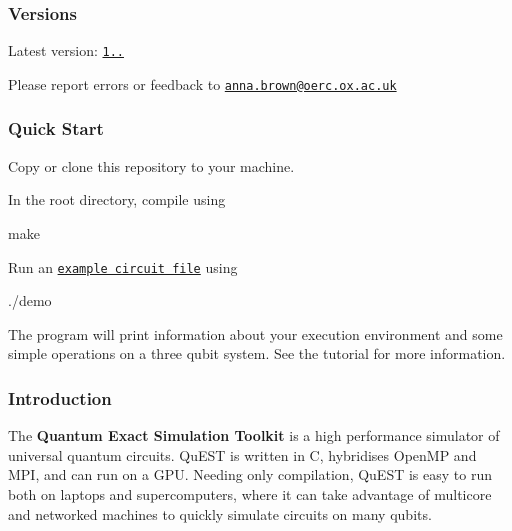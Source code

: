\subsubsection*{Versions}

Latest version\+: \href{https://github.com/aniabrown/QuEST/releases/tag/v1.0.0}{\tt 1..}

Please report errors or feedback to \href{mailto:anna.brown@oerc.ox.ac.uk}{\tt anna.\+brown@oerc.\+ox.\+ac.\+uk}

\subsubsection*{Quick Start}

Copy or clone this repository to your machine.

In the root directory, compile using


\begin{DoxyCode}
make
\end{DoxyCode}


Run an \href{tutorialExample.c}{\tt example circuit file} using


\begin{DoxyCode}
./demo
\end{DoxyCode}


The program will print information about your execution environment and some simple operations on a three qubit system. See the tutorial for more information.

\subsubsection*{Introduction}

The {\bfseries Quantum Exact Simulation Toolkit} is a high performance simulator of universal quantum circuits. Qu\+E\+ST is written in C, hybridises Open\+MP and M\+PI, and can run on a G\+PU. Needing only compilation, Qu\+E\+ST is easy to run both on laptops and supercomputers, where it can take advantage of multicore and networked machines to quickly simulate circuits on many qubits.


